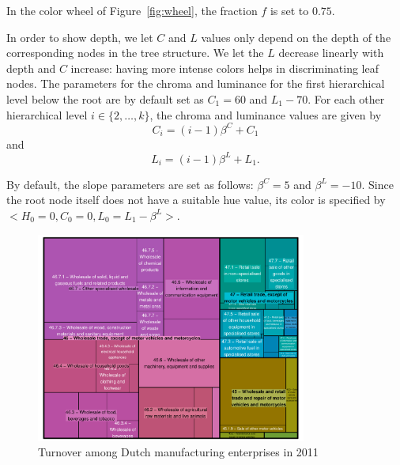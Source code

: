\documentclass[journal]{vgtc}                %
\begin{document}
In the color wheel of Figure~\ref{fig:wheel}, the fraction $f$ is set to $0.75$.




In order to show depth, we let $C$ and $L$ values only depend on the depth of the corresponding nodes in the tree structure. We let the $L$ decrease linearly with depth and $C$ increase: having more intense colors helps in discriminating leaf nodes. The parameters for the chroma and luminance for the first hierarchical level below the root are by default set as $C_1=60$ and $L_1-70$. For each other hierarchical level $i \in \{2, \ldots, k\}$, the chroma and luminance values are given by
\begin{equation}
C_i=(i-1)\beta^C + C_1
\end{equation}
and
\begin{equation}
L_i=(i-1)\beta^L + L_1.
\end{equation}

By default, the slope parameters are set as follows: $\beta^C=5$ and $\beta^L=-10$. Since the root node itself does not have a suitable hue value, its color is specified by $<H_0=0, C_0=0, L_0=L_1-\beta^L>$.


\begin{figure}[htb]
  \vspace{-4ex}
  \centering
  \includegraphics[width=3.5in]{TMbusiness.pdf}
  \vspace{-4ex}
  \caption{Turnover among Dutch manufacturing enterprises in 2011}\label{fig:treemapApp}
  \vspace{-4ex}
\end{figure}
\end{document}
